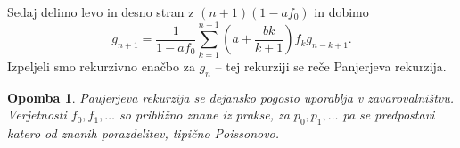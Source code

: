 \documentclass[10pt, a4paper]{article}
\newtheorem*{opomba}{Opomba}
\begin{document}
Sedaj delimo levo in desno stran z $(n + 1) (1 - af_0)$ in dobimo 
\begin{equation}
  g_{n + 1} = \frac{1}{1 - af_0} \sum_{k = 1} ^{n + 1} \left(a + \frac{bk}{k + 1}\right) f_k g_{n - k + 1}.
\end{equation}
Izpeljeli smo rekurzivno enačbo za $g_n$ -- tej rekurziji se reče Panjerjeva rekurzija.

\begin{opomba}
  Paujerjeva rekurzija se dejansko pogosto uporablja v zavarovalništvu.
  Verjetnosti $f_0, f_1, \dots$ so približno znane iz prakse, za $p_0, p_1, \dots$
  pa se predpostavi katero od znanih porazdelitev, tipično Poissonovo.
\end{opomba}
\end{document}
